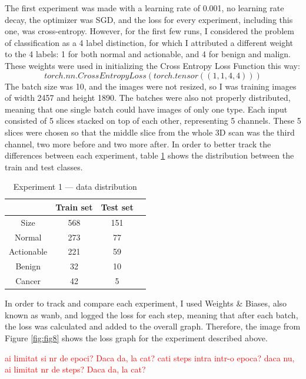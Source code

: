 The first experiment was made with a learning rate of 0.001, no learning rate decay, the optimizer was SGD, and the loss for every experiment, including this one, was cross-entropy. However, for the first few runs, I considered the problem of classification as a 4 label distinction, for which I attributed a different weight to the 4 labels: 1 for both normal and actionable, and 4 for benign and malign. These weights were used in initializing the Cross Entropy 
Loss Function this way:
\[torch.nn.CrossEntropyLoss(torch.tensor((1, 1, 4, 4)))\]
The batch size was 10, and the images were not resized, so I was training images of width 2457 and height 1890. The batches were also not properly distributed, meaning that one single batch could have images of only one type. Each input consisted of 5 slices stacked on top of each other, representing 5 channels. These 5 slices were chosen so that the middle slice from the whole 3D scan was the third channel, two more before and two more after. In order to better track the differences between each experiment, table \ref{tab:tab1} shows the distribution between the train and test classes.

\begin{table}[ht!]
\centering
\begin{tabular}{|c|c|c|c|}
    \hline
     & Train set & Test set \\ \hline
    Size & 568 & 151 \\ \hline
    Normal & 273 & 77\\ \hline
    Actionable & 221 & 59\\ \hline
    Benign & 32 & 10\\ \hline
    Cancer & 42 & 5\\ \hline
    \end{tabular}
    \caption{Experiment 1 --- data distribution}
    \label{tab:tab1}
\end{table}

In order to track and compare each experiment, I used Weights \& Biases, also known as wanb, and logged the loss for each step, meaning that after each batch, the loss was calculated and added to the overall graph. Therefore, the image from Figure \ref{fig:fig8} shows the loss graph for the experiment described above.

\textcolor{red}{ai limitat si nr de epoci? Daca da, la cat? cati steps intra intr-o epoca? daca nu, ai limitat nr de steps? Daca da, la cat?}

